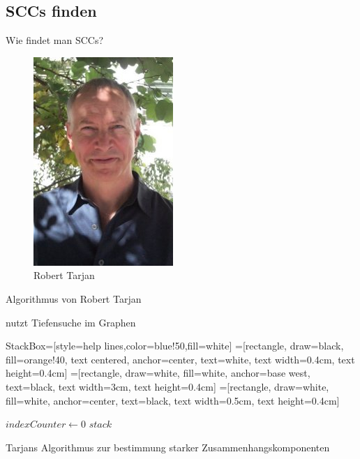 \subsection{SCCs finden}
\begin{frame}{Wie findet man SCCs?}{}
\begin{figure}
  \begin{center}
    \includegraphics{Material/Bob_Tarjan.jpg}
  \end{center}
  \caption{Robert Tarjan}
\end{figure}
Algorithmus von Robert Tarjan


nutzt Tiefensuche im Graphen
\end{frame}


\tikzstyle StackBox=[style=help lines,color=blue!50,fill=white]
=[rectangle, draw=black,
		fill=orange!40,
        text centered, anchor=center, text=white, text width=0.4cm, text height=0.4cm]
=[rectangle, draw=white,
		fill=white, anchor=base west, text=black, text width=3cm, text height=0.4cm]
=[rectangle, draw=white,
		fill=white, anchor=center, text=black, text width=0.5cm, text height=0.4cm]

\begin{frame}

\begin{algorithm}[H]
	\begin{algorithmic}
			\State $indexCounter \gets 0$
			\State $stack$
				\EndIf
			\EndFor
		\EndFunction
	\end{algorithmic}
\caption{Tarjans Algorithmus zur bestimmung starker Zusammenhangskomponenten}
\label{alg:seq1}
\end{algorithm}
\end{frame}

